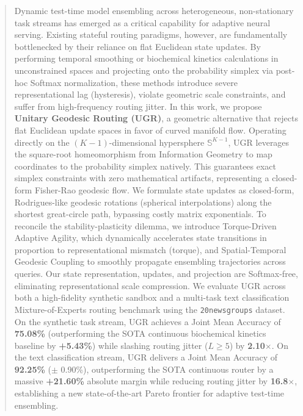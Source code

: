\begin{abstract}
Dynamic test-time model ensembling across heterogeneous, non-stationary task streams has emerged as a critical capability for adaptive neural serving.
Existing stateful routing paradigms, however, are fundamentally bottlenecked by their reliance on flat Euclidean state updates.
By performing temporal smoothing or biochemical kinetics calculations in unconstrained spaces and projecting onto the probability simplex via post-hoc Softmax normalization, these methods introduce severe representational lag (hysteresis), violate geometric scale constraints, and suffer from high-frequency routing jitter.
In this work, we propose \textbf{Unitary Geodesic Routing (UGR)}, a geometric alternative that rejects flat Euclidean update spaces in favor of curved manifold flow.
Operating directly on the $(K-1)$-dimensional hypersphere $\mathbb{S}^{K-1}$, UGR leverages the square-root homeomorphism from Information Geometry to map coordinates to the probability simplex natively.
This guarantees exact simplex constraints with zero mathematical artifacts, representing a closed-form Fisher-Rao geodesic flow.
We formulate state updates as closed-form, Rodrigues-like geodesic rotations (spherical interpolations) along the shortest great-circle path, bypassing costly matrix exponentials.
To reconcile the stability-plasticity dilemma, we introduce Torque-Driven Adaptive Agility, which dynamically accelerates state transitions in proportion to representational mismatch (torque), and Spatial-Temporal Geodesic Coupling to smoothly propagate ensembling trajectories across queries.
Our state representation, updates, and projection are Softmax-free, eliminating representational scale compression.
We evaluate UGR across both a high-fidelity synthetic sandbox and a multi-task text classification Mixture-of-Experts routing benchmark using the \texttt{20newsgroups} dataset.
On the synthetic task stream, UGR achieves a Joint Mean Accuracy of \textbf{75.08\%} (outperforming the SOTA continuous biochemical kinetics baseline by \textbf{+5.43\%}) while slashing routing jitter ($L \ge 5$) by \textbf{2.10$\times$}.
On the text classification stream, UGR delivers a Joint Mean Accuracy of \textbf{92.25\%} ($\pm$ 0.90\%), outperforming the SOTA continuous router by a massive \textbf{+21.60\%} absolute margin while reducing routing jitter by \textbf{16.8$\times$}, establishing a new state-of-the-art Pareto frontier for adaptive test-time ensembling.
\end{abstract}
